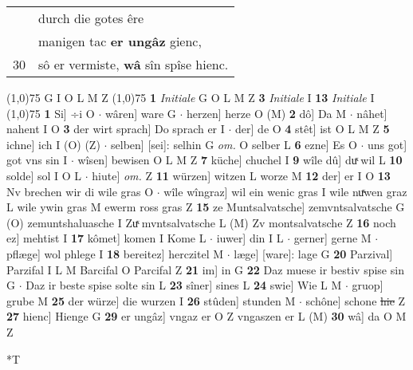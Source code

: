 \documentclass[8pt,a4paper,notitlepage]{article}
\begin{document}
\begin{table}[ht]
\begin{minipage}[t]{0.5\linewidth}
\begin{tabular}{rl}
 & durch die gotes êre\\ 
 & manigen tac \textbf{er ungâz} gienc,\\ 
30 & sô er vermiste, \textbf{wâ} sîn spîse hienc.\\ 
\end{tabular}
\scriptsize
\line(1,0){75} \newline
G I O L M Z \newline
\line(1,0){75} \newline
\textbf{1} \textit{Initiale} G O L M Z  \textbf{3} \textit{Initiale} I  \textbf{13} \textit{Initiale} I  \newline
\line(1,0){75} \newline
\textbf{1} Si] ÷i O  $\cdot$ wâren] ware G  $\cdot$ herzen] herze O (M) \textbf{2} dô] Da M  $\cdot$ nâhet] nahent I O \textbf{3} der wirt sprach] Do sprach er I  $\cdot$ der] de O \textbf{4} stêt] ist O L M Z \textbf{5} ichne] ich I (O) (Z)  $\cdot$ selben] [sei]: selhin G \textit{om.} O selber L \textbf{6} ezne] Es O  $\cdot$ uns got] got vns sin I  $\cdot$ wîsen] bewisen O L M Z \textbf{7} küche] chuchel I \textbf{9} wîle dû] duͯ wil L \textbf{10} solde] sol I O L  $\cdot$ hiute] \textit{om.} Z \textbf{11} würzen] witzen L worze M \textbf{12} der] er I O \textbf{13} Nv brechen wir di wile gras O  $\cdot$ wîle wîngraz] wil ein wenic gras I wile nuͯwen graz L wile ywin gras M ewerm ross gras Z \textbf{15} ze Muntsalvatsche] zemvntsalvatsche G (O) zemuntshaluasche I Zuͯ mvntsalvatsche L (M) Zv montsalvatsche Z \textbf{16} noch ez] mehtist I \textbf{17} kômet] komen I Kome L  $\cdot$ iuwer] din I L  $\cdot$ gerner] gerne M  $\cdot$ pflæge] wol phlege I \textbf{18} bereitez] herczitel M  $\cdot$ læge] [ware]: lage G \textbf{20} Parzival] Parzifal I L M Barcifal O Parcifal Z \textbf{21} im] in G \textbf{22} Daz muese ir bestiv spise sin G  $\cdot$ Daz ir beste spise solte sin L \textbf{23} sîner] sines L \textbf{24} swie] Wie L M  $\cdot$ gruop] grube M \textbf{25} der würze] die wurzen I \textbf{26} stûden] stunden M  $\cdot$ schône] schone \sout{hie} Z \textbf{27} hienc] Hienge G \textbf{29} er ungâz] vngaz er O Z vngaszen er L (M) \textbf{30} wâ] da O M Z \newline
\end{minipage}
\hspace{0.5cm}
\begin{minipage}[t]{0.5\linewidth}
\small
\begin{center}*T
\end{center}
\begin{tabular}{rl}

\end{tabular}
\end{minipage}
\end{table}
\end{document}
